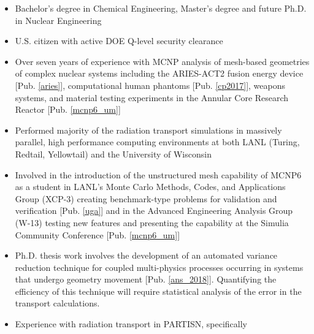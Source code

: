 \begin{center}
\begin{minipage}{\textwidth}
\begin{itemize}[leftmargin=.875in,rightmargin=.75in,itemsep=1.0mm]
               \item Bachelor's degree in Chemical Engineering, Master's degree
		       and future Ph.D. in Nuclear Engineering
               \item U.S. citizen with active DOE Q-level security clearance 
                \item Over seven years of experience with MCNP analysis of
			mesh-based geometries of complex nuclear
		      systems including the ARIES-ACT2 fusion energy device
		      [Pub. \ref{aries}],
		      computational human phantoms
		      [Pub. \ref{cp2017}], weapons systems, and material testing
		      experiments in the
		      Annular Core Research Reactor [Pub.
		      \ref{mcnp6_um}]
               \item Performed majority of the radiation transport simulations 
                     in massively parallel, high performance computing 
                     environments at both LANL (Turing, Redtail, Yellowtail) 
                     and the University of Wisconsin 
	       \item Involved in the introduction of the unstructured mesh capability
                     of MCNP6 as a student in LANL's Monte Carlo Methods, 
                     Codes, and Applications Group (XCP-3)
                     creating benchmark-type problems for validation and
		     verification [Pub. \ref{uga}] and 
                     in the Advanced Engineering Analysis Group (W-13) 
                     testing new features and 
                     presenting the capability at the Simulia Community Conference
                     [Pub. \ref{mcnp6_um}]
	       \item Ph.D. thesis work involves the development of an automated variance reduction technique for
		       coupled multi-physics processes occurring in 
		       systems that undergo geometry movement
                       [Pub. \ref{ans_2018}].  
                       Quantifying the efficiency of this technique will require
                       statistical analysis of the error in the transport calculations.
              \item Experience with radiation transport in PARTISN, specifically

\end{itemize}
\end{minipage}
\end{center}
